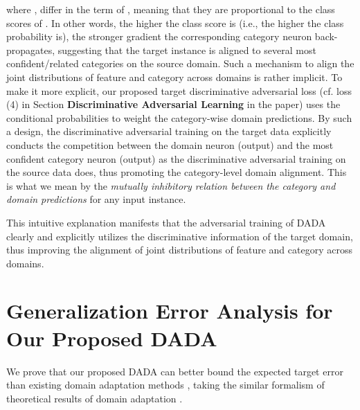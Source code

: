 \documentclass[letterpaper]{article} \usepackage{aaai20}  \usepackage{times}  \usepackage{helvet} \usepackage{courier}  \usepackage[hyphens]{url}  \usepackage{graphicx} \urlstyle{rm} \def\UrlFont{\rm}  \usepackage{graphicx}  \frenchspacing  \setlength{\pdfpagewidth}{8.5in}  \setlength{\pdfpageheight}{11in}
\begin{document}
where ,  differ in the term of , meaning that they are proportional to the class scores of . In other words, the higher the class score is (i.e., the higher the class probability is), the stronger gradient the corresponding category neuron back-propagates, suggesting that the target instance is aligned to several most confident/related categories on the source domain. Such a mechanism to align the joint distributions of feature and category across domains is rather implicit. To make it more explicit, our proposed target discriminative adversarial loss (cf. loss (4) in Section \textbf{Discriminative Adversarial Learning} in the paper) uses the conditional probabilities to weight the category-wise domain predictions. By such a design, the discriminative adversarial training on the target data explicitly conducts the competition between the domain neuron (output) and the most confident category neuron (output) as the discriminative adversarial training on the source data does, thus promoting the category-level domain alignment. This is what we mean by the \emph{mutually inhibitory relation between the category and domain predictions} for any input instance.

This intuitive explanation manifests that the adversarial training of DADA clearly and explicitly utilizes the discriminative information of the target domain, thus improving the alignment of joint distributions of feature and category across domains. 

\section{Generalization Error Analysis for Our Proposed DADA}
\label{sec3}
We prove that our proposed DADA can better bound the expected target error than existing domain adaptation methods \cite{dann,adda,mada,SimNet,iCAN,dirt_t,cdan,tada,hla,dann_ca}, taking the similar formalism of theoretical results of domain adaptation \cite{da_theory1,da_theory2}.
\end{document}
